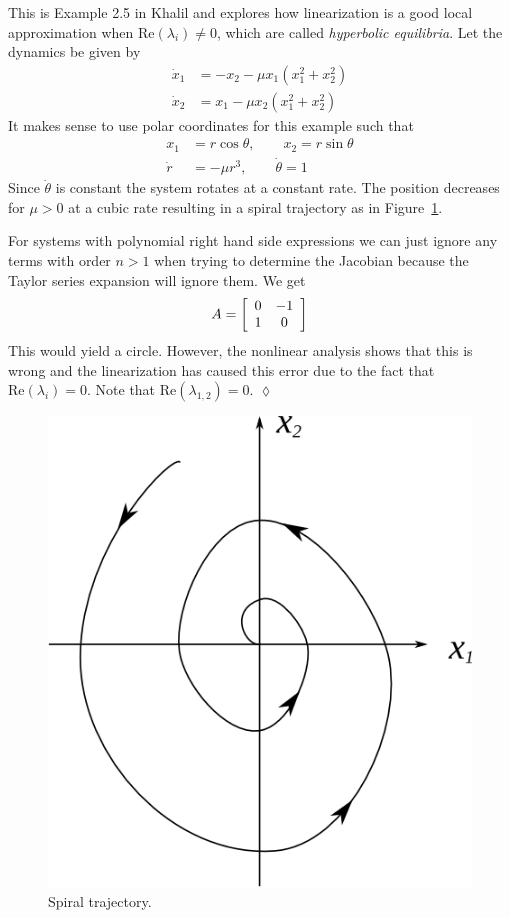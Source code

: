 \begin{example}
This is Example 2.5 in Khalil and explores how linearization is a good local approximation when $\text{Re} (\lambda_i)\neq0$, which are called \textit{hyperbolic equilibria}.
Let the dynamics be given by
\begin{align*}
\dot{x}_1 &= -x_2 - \mu x_1(x_1^2 + x_2^2) \\
\dot{x}_2 &= x_1 - \mu x_2(x_1^2 + x_2^2)
\end{align*}
It makes sense to use polar coordinates for this example such that
\begin{align*}
x_1 &= r\cos\theta, \qquad x_2 = r\sin\theta \\
\dot{r} &= -\mu r^3, \qquad \dot{\theta} = 1
\end{align*}
Since $\dot{\theta}$ is constant the system rotates at a constant rate.
The position decreases for $\mu>0$ at a cubic rate resulting in a spiral trajectory as in Figure~\ref{fig:03cubic}.

For systems with polynomial right hand side expressions we can just ignore any terms with order $n>1$ when trying to determine the Jacobian because the Taylor series expansion will ignore them.
We get
$$A = \left[\begin{array}{c c} 0 & -1 \\ 1 & 0 \end{array}\right]$$
This would yield a circle.
However, the nonlinear analysis shows that this is wrong and the linearization has caused this error due to the fact that $\text{Re} (\lambda_i) = 0$.
Note that $\text{Re} (\lambda_{1,2}) = 0$.
$\lozenge$
\end{example}

\begin{figure}[ht!]
	\centering
	\includegraphics[width=.5\textwidth]{images/03cubic}
	\caption{Spiral trajectory.}
	\label{fig:03cubic}
\end{figure}


